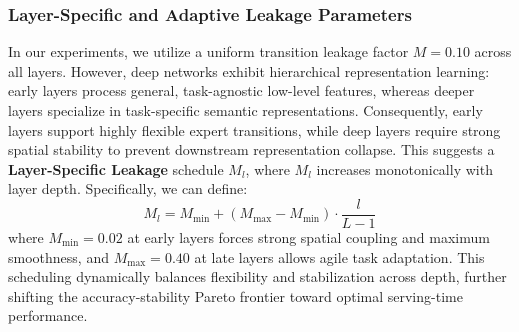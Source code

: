 \subsubsection{Layer-Specific and Adaptive Leakage Parameters}
In our experiments, we utilize a uniform transition leakage factor $M = 0.10$ across all layers. However, deep networks exhibit hierarchical representation learning: early layers process general, task-agnostic low-level features, whereas deeper layers specialize in task-specific semantic representations. 
Consequently, early layers support highly flexible expert transitions, while deep layers require strong spatial stability to prevent downstream representation collapse. 
This suggests a \textbf{Layer-Specific Leakage} schedule $M_l$, where $M_l$ increases monotonically with layer depth. 
Specifically, we can define:
\begin{equation}
    M_l = M_{\text{min}} + (M_{\text{max}} - M_{\text{min}}) \cdot \frac{l}{L-1}
\end{equation}
where $M_{\text{min}} = 0.02$ at early layers forces strong spatial coupling and maximum smoothness, and $M_{\text{max}} = 0.40$ at late layers allows agile task adaptation. This scheduling dynamically balances flexibility and stabilization across depth, further shifting the accuracy-stability Pareto frontier toward optimal serving-time performance.
